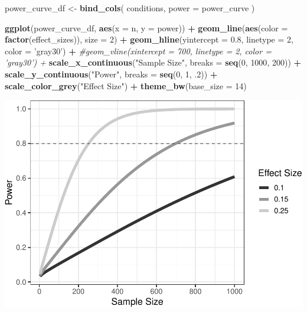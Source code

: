 \documentclass[man]{apa6}
\newenvironment{Shaded}{\begin{snugshade}}{\end{snugshade}}
\newcommand{\CommentTok}[1]{\textcolor[rgb]{0.56,0.35,0.01}{\textit{#1}}}
\newcommand{\DataTypeTok}[1]{\textcolor[rgb]{0.13,0.29,0.53}{#1}}
\newcommand{\DecValTok}[1]{\textcolor[rgb]{0.00,0.00,0.81}{#1}}
\newcommand{\FloatTok}[1]{\textcolor[rgb]{0.00,0.00,0.81}{#1}}
\newcommand{\KeywordTok}[1]{\textcolor[rgb]{0.13,0.29,0.53}{\textbf{#1}}}
\newcommand{\NormalTok}[1]{#1}
\newcommand{\OperatorTok}[1]{\textcolor[rgb]{0.81,0.36,0.00}{\textbf{#1}}}
\newcommand{\StringTok}[1]{\textcolor[rgb]{0.31,0.60,0.02}{#1}}
\begin{document}
\begin{Shaded}
\begin{Highlighting}[]
\NormalTok{power_curve_df <-}\StringTok{ }\KeywordTok{bind_cols}\NormalTok{(}
\NormalTok{  conditions, }
  \DataTypeTok{power =}\NormalTok{ power_curve}
\NormalTok{)}

\KeywordTok{ggplot}\NormalTok{(power_curve_df, }\KeywordTok{aes}\NormalTok{(}\DataTypeTok{x =}\NormalTok{ n, }\DataTypeTok{y =}\NormalTok{ power)) }\OperatorTok{+}\StringTok{ }
\StringTok{  }\KeywordTok{geom_line}\NormalTok{(}\KeywordTok{aes}\NormalTok{(}\DataTypeTok{color =} \KeywordTok{factor}\NormalTok{(effect_sizes)), }\DataTypeTok{size =} \DecValTok{2}\NormalTok{) }\OperatorTok{+}\StringTok{ }
\StringTok{  }\KeywordTok{geom_hline}\NormalTok{(}\DataTypeTok{yintercept =} \FloatTok{0.8}\NormalTok{, }\DataTypeTok{linetype =} \DecValTok{2}\NormalTok{, }\DataTypeTok{color =} \StringTok{'gray30'}\NormalTok{) }\OperatorTok{+}\StringTok{ }
\StringTok{  }\CommentTok{#geom_vline(xintercept = 700, linetype = 2, color = 'gray30') +}
\StringTok{  }\KeywordTok{scale_x_continuous}\NormalTok{(}\StringTok{"Sample Size"}\NormalTok{, }\DataTypeTok{breaks =} \KeywordTok{seq}\NormalTok{(}\DecValTok{0}\NormalTok{, }\DecValTok{1000}\NormalTok{, }\DecValTok{200}\NormalTok{)) }\OperatorTok{+}\StringTok{ }
\StringTok{  }\KeywordTok{scale_y_continuous}\NormalTok{(}\StringTok{"Power"}\NormalTok{, }\DataTypeTok{breaks =} \KeywordTok{seq}\NormalTok{(}\DecValTok{0}\NormalTok{, }\DecValTok{1}\NormalTok{, }\FloatTok{.2}\NormalTok{)) }\OperatorTok{+}
\StringTok{  }\KeywordTok{scale_color_grey}\NormalTok{(}\StringTok{"Effect Size"}\NormalTok{) }\OperatorTok{+}
\StringTok{  }\KeywordTok{theme_bw}\NormalTok{(}\DataTypeTok{base_size =} \DecValTok{14}\NormalTok{)}
\end{Highlighting}
\end{Shaded}

\includegraphics{power_simulation_files/figure-latex/vis-power-curve-1.pdf}
\end{document}
